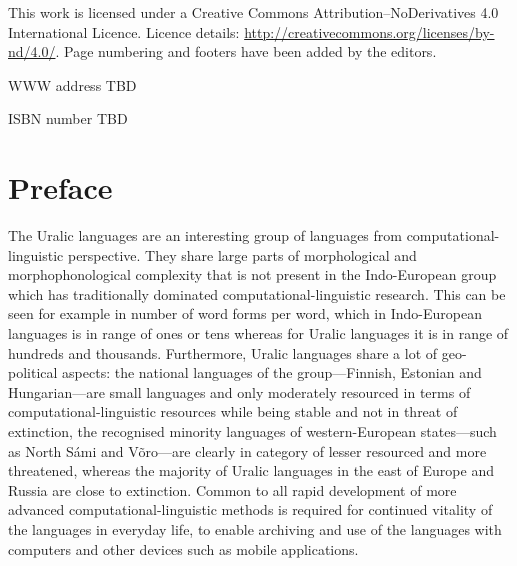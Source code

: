 \documentclass[b5paper]{book}
\begin{document}
\frontmatter

\cleardoublepage
\thispagestyle{empty}
{\centering{}}

This work is licensed under a Creative Commons Attribution–NoDerivatives
4.0 International Licence.  Licence details:
\url{http://creativecommons.org/licenses/by-nd/4.0/}. Page numbering and
footers have been added by the editors.

WWW address TBD

ISBN number TBD

\clearpage

\pagestyle{fancy}

\chapter*{Preface}

The Uralic languages are an interesting group of languages from computational-linguistic perspective. They share 
large parts of morphological and morphophonological
complexity that is not present in the Indo-European group which has
traditionally dominated computational-linguistic research. This can be
seen for example in number of word forms per word, which in Indo-European
languages is in range of ones or tens whereas for Uralic languages it is
in range of hundreds and thousands. Furthermore, Uralic languages share a lot
of geo-political aspects: the national languages of the group---Finnish,
Estonian and Hungarian---are small languages and only moderately resourced
in terms of computational-linguistic resources while being stable and
not in threat of extinction, the recognised minority languages of western-European 
states---such as North Sámi and Võro---are clearly in category
of lesser resourced and more threatened, whereas the majority of Uralic
languages in the east of Europe and Russia are close to extinction. Common
to all rapid development of more advanced computational-linguistic methods
is required for continued vitality of the languages in everyday life, to
enable archiving and use of the languages with computers and other devices
such as mobile applications.
\end{document}
